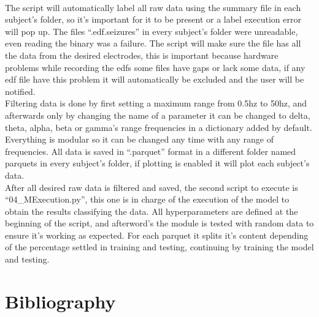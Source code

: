 ﻿\documentclass[10pt,a4paper,twocolumn,twoside]{article}
\begin{document}
\leavevmode\\
The script will automatically label all raw data using the summary file in each subject’s folder, so it’s important for it to be present or a label execution error will pop up. The files “.edf.seizures” in every subject’s folder were unreadable, even reading the binary was a failure. The script will make sure the file has all the data from the desired electrodes, this is important because hardware problems while recording the edfs some files have gaps or lack some data, if any edf file have this problem it will automatically be excluded and the user will be notified.
\\
Filtering data is done by first setting a maximum range from 0.5hz to 50hz, and afterwards only by changing the name of a parameter it can be changed to delta, theta, alpha, beta or gamma’s range frequencies in a dictionary added by default. Everything is modular so it can be changed any time with any range of frequencies. All data is saved in “.parquet” format in a different folder named parquets in every subject’s folder, if plotting is enabled it will plot each subject’s data.
\\
After all desired raw data is filtered and saved, the second script to execute is “04\_MExecution.py”, this one is in charge of the execution of the model to obtain the results classifying the data. All hyperparameters are defined at the beginning of the script, and afterword’s the module is tested with random data to ensure it’s working as expected. For each parquet it splits it’s content depending of the percentage settled in training and testing, continuing by training the model and testing.






\section{Bibliography}
\label{sec-bibliography}

\printbibliography

\end{document}
